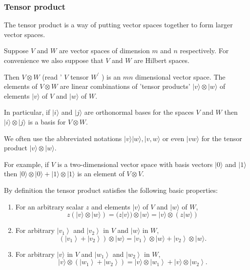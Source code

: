 
\subsubsection{Tensor product}

The tensor product is a way of putting vector spaces together to form larger vector spaces. 


Suppose $V$ and $W$ are vector spaces of dimension $m$ and $n$ respectively. For convenience we also suppose that $V$ and $W$ are Hilbert spaces. 

Then $V \otimes W$ (read ' $V$ tensor $W^{\prime}$ ) is an $m n$ dimensional vector space. The elements of $V \otimes W$ are linear combinations of 'tensor products' $|v\rangle \otimes|w\rangle$ of elements $|v\rangle$ of $V$ and $|w\rangle$ of $W$.

In particular, if $|i\rangle$ and $|j\rangle$ are orthonormal bases for the spaces $V$ and $W$ then $|i\rangle \otimes|j\rangle$ is a basis for $V \otimes W$. 

We often use the abbreviated notations $|v\rangle|w\rangle,|v, w\rangle$ or even $|v w\rangle$ for the tensor product $|v\rangle \otimes|w\rangle$. 

\begin{example}
    For example, if $V$ is a two-dimensional vector space with basis vectors $|0\rangle$ and $|1\rangle$ then $|0\rangle \otimes|0\rangle+|1\rangle \otimes|1\rangle$ is an element of $V \otimes V$.
\end{example}

By definition the tensor product satisfies the following basic properties:
\begin{enumerate}
    \item For an arbitrary scalar $z$ and elements $|v\rangle$ of $V$ and $|w\rangle$ of $W$,
$$
z(|v\rangle \otimes|w\rangle)=(z|v\rangle) \otimes|w\rangle=|v\rangle \otimes(z|w\rangle)
$$
    \item For arbitrary $\left|v_{1}\right\rangle$ and $\left|v_{2}\right\rangle$ in $V$ and $|w\rangle$ in $W$,
$$
\left(\left|v_{1}\right\rangle+\left|v_{2}\right\rangle\right) \otimes|w\rangle=\left|v_{1}\right\rangle \otimes|w\rangle+\left|v_{2}\right\rangle \otimes|w\rangle .
$$
    \item For arbitrary $|v\rangle$ in $V$ and $\left|w_{1}\right\rangle$ and $\left|w_{2}\right\rangle$ in $W$,
$$
|v\rangle \otimes\left(\left|w_{1}\right\rangle+\left|w_{2}\right\rangle\right)=|v\rangle \otimes\left|w_{1}\right\rangle+|v\rangle \otimes\left|w_{2}\right\rangle .
$$
\end{enumerate}


